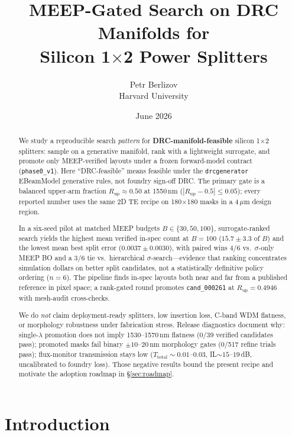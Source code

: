 \documentclass[11pt,a4paper]{article}
\title{%
  MEEP-Gated Search on DRC Manifolds for\\
  Silicon 1$\times$2 Power Splitters
}
\author{Petr Berlizov\\
  Harvard University}
\date{June 2026}
\begin{document}
\maketitle

\begin{abstract}
We study a reproducible search \emph{pattern} for \textbf{DRC-manifold-feasible} silicon 1$\times$2 splitters: sample on a generative manifold, rank with a lightweight surrogate, and promote only MEEP-verified layouts under a frozen forward-model contract (\texttt{phase0\_v1}).
Here ``DRC-feasible'' means feasible under the \texttt{drcgenerator} EBeamModel generative rules, not foundry sign-off DRC.
The primary gate is a balanced upper-arm fraction $R_{\mathrm{up}} \approx 0.50$ at 1550\,nm ($|R_{\mathrm{up}}-0.5|\le 0.05$); every reported number uses the same 2D TE recipe on 180$\times$180 masks in a 4\,$\mu$m design region.

In a six-seed pilot at matched MEEP budgets $B\in\{30,50,100\}$, surrogate-ranked search yields the highest mean verified in-spec count at $B{=}100$ ($15.7\pm 3.3$ of $B$) and the lowest mean best split error ($0.0037\pm 0.0030$), with paired wins 4/6 vs.\ $\sigma$-only MEEP BO and a 3/6 tie vs.\ hierarchical $\sigma$-search---evidence that ranking concentrates simulation dollars on better split candidates, not a statistically definitive policy ordering ($n{=}6$).
The pipeline finds in-spec layouts both near and far from a published reference in pixel space; a rank-gated round promotes \texttt{cand\_000261} at $R_{\mathrm{up}}=0.4946$ with mesh-audit cross-checks.

We do \emph{not} claim deployment-ready splitters, low insertion loss, C-band WDM flatness, or morphology robustness under fabrication stress.
Release diagnostics document why: single-$\lambda$ promotion does not imply 1530--1570\,nm flatness (0/39 verified candidates pass); promoted masks fail binary $\pm 10$--$20$\,nm morphology gates (0/517 refine trials pass); flux-monitor transmission stays low ($T_{\mathrm{total}}\sim 0.01$--$0.03$, IL$\sim 15$--$19$\,dB, uncalibrated to foundry loss).
Those negative results bound the present recipe and motivate the adoption roadmap in \S\ref{sec:roadmap}.
\end{abstract}

\section{Introduction}
\label{sec:intro}
\end{document}
